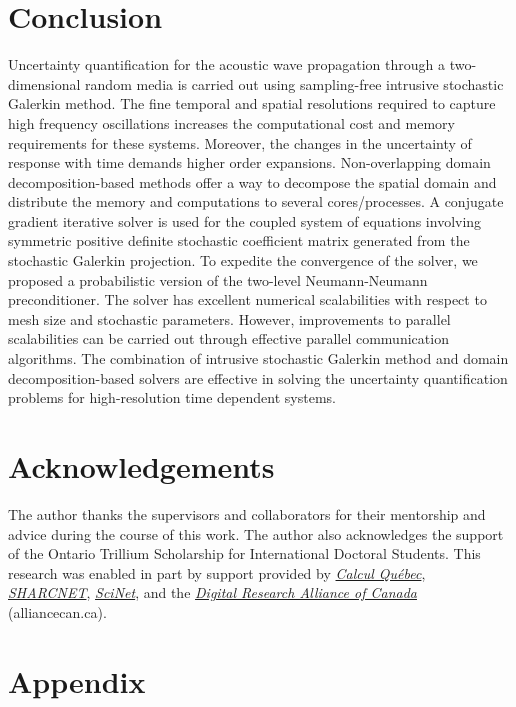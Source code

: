 \documentclass{article}
\begin{document}
\section{Conclusion}
\textcolor{ss}{Uncertainty quantification for the acoustic wave propagation through a two-dimensional random media is carried out using sampling-free intrusive stochastic Galerkin method. The fine temporal and spatial resolutions required to capture high frequency oscillations increases the computational cost and memory requirements for these systems. Moreover, the changes in the uncertainty of response with time demands higher order expansions. Non-overlapping domain decomposition-based methods offer a way to decompose the spatial domain and distribute the memory and computations to several cores/processes. A conjugate gradient iterative solver is used for the coupled system of equations involving symmetric positive definite stochastic coefficient matrix generated from the stochastic Galerkin projection. To expedite the convergence of the solver, we proposed a probabilistic version of the two-level Neumann-Neumann preconditioner. The solver has excellent numerical scalabilities with respect to mesh size and stochastic parameters. However, improvements to parallel scalabilities can be carried out through effective parallel communication algorithms. The combination of intrusive stochastic Galerkin method and domain decomposition-based solvers are effective in solving the uncertainty quantification problems for high-resolution time dependent systems. }



\section*{Acknowledgements}

The author thanks the supervisors and collaborators for their mentorship and advice during the course of this work.  The author also acknowledges the support of the Ontario Trillium Scholarship for International Doctoral Students. This research was enabled in part by support provided by \href{https://www.calculquebec.ca/}{\textit{Calcul Qu\'{e}bec}}, \href{https://www.sharcnet.ca/}{\textit{SHARCNET}}, \href{https://www.scinethpc.ca/}{\textit{SciNet}}, and the \href{https://alliancecan.ca/}{\textit{Digital Research Alliance of Canada}} (alliancecan.ca).

\newpage

\appendix

\section*{Appendix}
\end{document}
